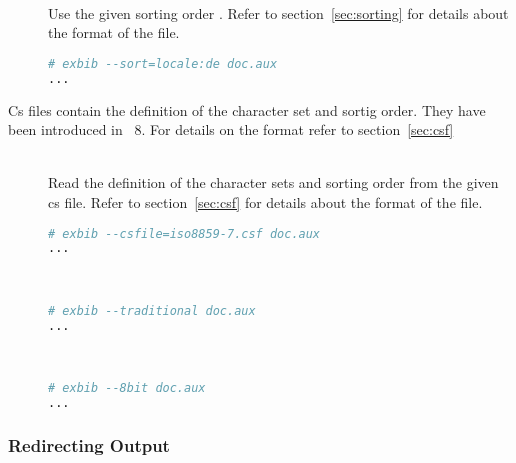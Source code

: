 \begin{description}
\item[ ]
\item[ ]\ \\
  Use the given sorting order . Refer to section~\ref{sec:sorting} for
  details about the format of the file.

  \INCOMPLETE

\begin{lstlisting}[language=sh]
# exbib --sort=locale:de doc.aux
...
\end{lstlisting}

\end{description}


Cs files contain the definition of the character set and sortig
order. They have been introduced in \BibTeX~8.
For details on the format refer to section~\ref{sec:csf}

\begin{description}
\item[ ]\ \\
  Read the definition of the character sets and sorting order from the
  given cs file. Refer to section~\ref{sec:csf} for details about the
  format of the file.
\begin{lstlisting}[language=sh]
# exbib --csfile=iso8859-7.csf doc.aux
...
\end{lstlisting}

\item[]
\item[]\ \\
  \INCOMPLETE
\begin{lstlisting}[language=sh]
# exbib --traditional doc.aux
...
\end{lstlisting}

\item[]
\item[]\ \\
  \INCOMPLETE
\begin{lstlisting}[language=sh]
# exbib --8bit doc.aux
...
\end{lstlisting}
\end{description}

\subsubsection{Redirecting Output}

